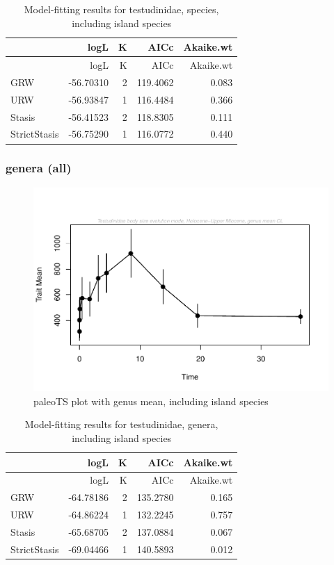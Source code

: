 \documentclass[]{article}
\begin{document}
\begin{longtable}[]{@{}lrrrr@{}}
\caption{Model-fitting results for testudinidae, species, including
island species}\tabularnewline
\toprule
& logL & K & AICc & Akaike.wt\tabularnewline
\midrule
\endfirsthead
\toprule
& logL & K & AICc & Akaike.wt\tabularnewline
\midrule
\endhead
GRW & -56.70310 & 2 & 119.4062 & 0.083\tabularnewline
URW & -56.93847 & 1 & 116.4484 & 0.366\tabularnewline
Stasis & -56.41523 & 2 & 118.8305 & 0.111\tabularnewline
StrictStasis & -56.75290 & 1 & 116.0772 & 0.440\tabularnewline
\bottomrule
\end{longtable}

\newpage

\subsubsection{genera (all)}\label{genera-all}

\begin{figure}[htbp]
\centering
\includegraphics{MA_JJ_files/figure-latex/paleoTS plot with genus mean, including island species-1.pdf}
\caption{paleoTS plot with genus mean, including island species}
\end{figure}

\begin{longtable}[]{@{}lrrrr@{}}
\caption{Model-fitting results for testudinidae, genera, including
island species}\tabularnewline
\toprule
& logL & K & AICc & Akaike.wt\tabularnewline
\midrule
\endfirsthead
\toprule
& logL & K & AICc & Akaike.wt\tabularnewline
\midrule
\endhead
GRW & -64.78186 & 2 & 135.2780 & 0.165\tabularnewline
URW & -64.86224 & 1 & 132.2245 & 0.757\tabularnewline
Stasis & -65.68705 & 2 & 137.0884 & 0.067\tabularnewline
StrictStasis & -69.04466 & 1 & 140.5893 & 0.012\tabularnewline
\bottomrule
\end{longtable}
\end{document}
